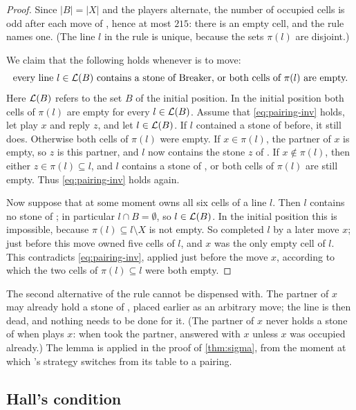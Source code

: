 \begin{proof}
Since $|B|=|X|$ and the players alternate, the number of occupied cells is odd after each move of \Maker,
hence at most $215$: there is an empty cell, and the rule names one. (The line $l$ in the rule is unique,
because the sets $\pi(l)$ are disjoint.)

We claim that the following holds whenever \Maker{} is to move:
\begin{equation}\label{eq:pairing-inv}
  \text{every line $l\in\mathcal{L}(B)$ contains a stone of Breaker, or both cells of $\pi(l)$ are empty.}
\end{equation}
Here $\mathcal{L}(B)$ refers to the set $B$ of the initial position. In the initial position both cells of
$\pi(l)$ are empty for every $l\in\mathcal{L}(B)$. Assume that \eqref{eq:pairing-inv} holds, let \Maker{} play
$x$ and \Breaker{} reply $z$, and let $l\in\mathcal{L}(B)$. If $l$ contained a stone of \Breaker{} before, it
still does. Otherwise both cells of $\pi(l)$ were empty. If $x\in\pi(l)$, the partner of $x$ is empty, so
$z$ is this partner, and $l$ now contains the stone $z$ of \Breaker. If $x\notin\pi(l)$, then either
$z\in\pi(l)\subseteq l$, and $l$ contains a stone of \Breaker, or both cells of $\pi(l)$ are still empty.
Thus \eqref{eq:pairing-inv} holds again.

Now suppose that at some moment \Maker{} owns all six cells of a line $l$. Then $l$ contains no stone of
\Breaker; in particular $l\cap B=\emptyset$, so $l\in\mathcal{L}(B)$. In the initial position this is
impossible, because $\pi(l)\subseteq l\setminus X$ is not empty. So \Maker{} completed $l$ by a later move
$x$; just before this move \Maker{} owned five cells of $l$, and $x$ was the only empty cell of $l$. This
contradicts \eqref{eq:pairing-inv}, applied just before the move $x$, according to which the two cells of
$\pi(l)\subseteq l$ were both empty.
\end{proof}

The second alternative of the rule cannot be dispensed with. The partner of $x$ may already hold a stone
of \Breaker, placed earlier as an arbitrary move; the line is then dead, and nothing needs to be done for
it. (The partner of $x$ never holds a stone of \Maker{} when \Maker{} plays $x$: when \Maker{} took the
partner, \Breaker{} answered with $x$ unless $x$ was occupied already.) The
lemma is applied in the proof of \cref{thm:sigma}, from the moment at which \Breaker's strategy switches
from its table to a pairing.

\subsection{Hall's condition}\label{ssec:hall}

